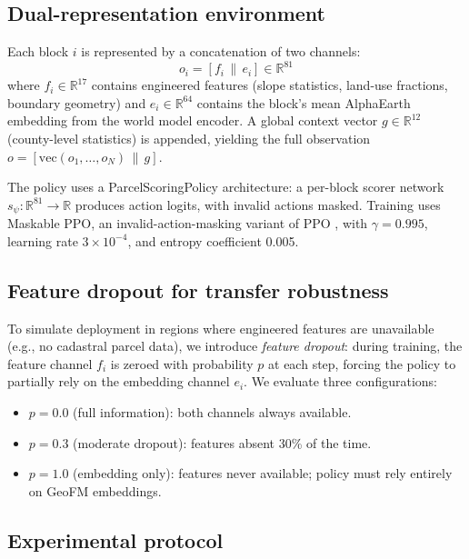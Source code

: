 \documentclass{article}
\begin{document}
\subsection{Dual-representation environment}

Each block $i$ is represented by a concatenation of two channels:
\begin{equation}
o_i = [f_i \,\|\, e_i] \in \mathbb{R}^{81}
\end{equation}
where $f_i \in \mathbb{R}^{17}$ contains engineered features (slope statistics, land-use fractions, boundary geometry) and $e_i \in \mathbb{R}^{64}$ contains the block's mean AlphaEarth embedding from the world model encoder. A global context vector $g \in \mathbb{R}^{12}$ (county-level statistics) is appended, yielding the full observation $o = [\text{vec}(o_1, \ldots, o_N) \,\|\, g]$.

The policy uses a ParcelScoringPolicy architecture: a per-block scorer network $s_\psi: \mathbb{R}^{81} \to \mathbb{R}$ produces action logits, with invalid actions masked. Training uses Maskable PPO, an invalid-action-masking variant of PPO \citep{schulman2017ppo,huang2022maskableppo}, with $\gamma = 0.995$, learning rate $3 \times 10^{-4}$, and entropy coefficient 0.005.

\subsection{Feature dropout for transfer robustness}

To simulate deployment in regions where engineered features are unavailable (e.g., no cadastral parcel data), we introduce \textit{feature dropout}: during training, the feature channel $f_i$ is zeroed with probability $p$ at each step, forcing the policy to partially rely on the embedding channel $e_i$. We evaluate three configurations:
\begin{itemize}
\item $p = 0.0$ (full information): both channels always available.
\item $p = 0.3$ (moderate dropout): features absent 30\% of the time.
\item $p = 1.0$ (embedding only): features never available; policy must rely entirely on GeoFM embeddings.
\end{itemize}

\subsection{Experimental protocol}
\end{document}
